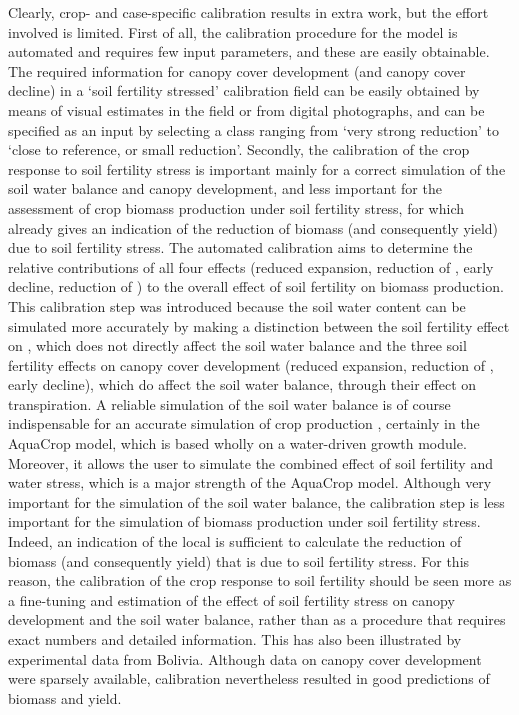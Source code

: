 Clearly, crop- and case-specific calibration results in extra work, but the effort involved is limited. First of all, the calibration procedure for the model is automated and requires few input parameters, and these are easily obtainable. The required information for canopy cover development (\CCx and canopy cover decline) in a `soil fertility stressed' calibration field can be easily obtained by means of visual estimates in the field or from digital photographs, and can be specified as an input by selecting a class ranging from `very strong reduction' to `close to reference, or small reduction'. Secondly, the calibration of the crop response to soil fertility stress is important mainly for a correct simulation of the soil water balance and canopy development, and less important for the assessment of crop biomass production under soil fertility stress, for which \Brel already gives an indication of the reduction of biomass (and consequently yield) due to soil fertility stress. The automated calibration aims to determine the relative contributions of all four effects (reduced \CC expansion, reduction of \CCx, early \CC decline, reduction of \WPster) to the overall effect of soil fertility on biomass production. This calibration step was introduced because the soil water content can be simulated more accurately by making a distinction between the soil fertility effect on \WPster, which does not directly affect the soil water balance and the three soil fertility effects on canopy cover development (reduced \CC expansion, reduction of \CCx, early \CC decline), which do affect the soil water balance, through their effect on transpiration. A reliable simulation of the soil water balance is of course indispensable for an accurate simulation of crop production \parencite{aggarwal1995, eitzinger2004}, certainly in the AquaCrop model, which is based wholly on a water-driven growth module. Moreover, it allows the user to simulate the combined effect of soil fertility and water stress, which is a major strength of the AquaCrop model. Although very important for the simulation of the soil water balance, the calibration step is less important for the simulation of biomass production under soil fertility stress. Indeed, an indication of the local \Brel is sufficient to calculate the reduction of biomass (and consequently yield) that is due to soil fertility stress. For this reason, the calibration of the crop response to soil fertility should be seen more as a fine-tuning and estimation of the effect of soil fertility stress on canopy development and the soil water balance, rather than as a procedure that requires exact numbers and detailed information. This has also been illustrated by experimental data from Bolivia. Although data on canopy cover development were sparsely available, calibration nevertheless resulted in good predictions of biomass and yield. 

